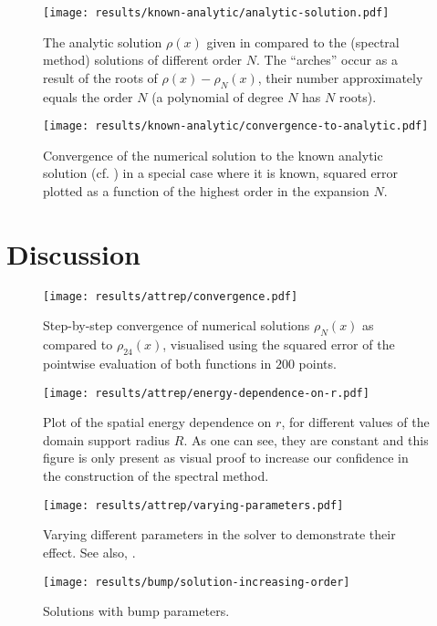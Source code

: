\begin{figure}[H]
  \centering
  \label{fig:analytic-solution}
  \texttt{[image: results/known-analytic/analytic-solution.pdf]}
  \caption[Comparison with analytical solutions and error]{
    The analytic solution $\rho(x)$ given in  compared to the (spectral method) solutions of different order $N$.
    The ``arches'' occur as a result of the roots of $\rho(x) - \rho_N(x)$, their number approximately equals the order $N$ (a polynomial of degree $N$ has $N$ roots).
  }
\end{figure}



\begin{figure}[H]
  \centering
  \label{fig:convergence-to-analytic}
  \texttt{[image: results/known-analytic/convergence-to-analytic.pdf]}
  \caption[Convergence to analytic solution]{Convergence of the numerical solution to the known analytic solution (cf. ) in a special case where it is known, squared error plotted as a function of the highest order in the expansion $N$.}
\end{figure}

\section{Discussion}
\begin{figure}[H]
  \centering
  \label{fig:convergence}
  \texttt{[image: results/attrep/convergence.pdf]}
  \caption[Step-by-step convergence of solutions compared to order 24]{Step-by-step convergence of numerical solutions $\rho_N(x)$ as compared to $\rho_{24}(x)$, visualised using the squared error of the pointwise evaluation of both functions in $200$ points.}
\end{figure}

\begin{figure}[H]
  \centering
  \label{fig:spatial-energy-dependence}
  \texttt{[image: results/attrep/energy-dependence-on-r.pdf]}
  \caption[Spatial energy dependence on $r$]{Plot of the spatial energy dependence on $r$, for different values of the domain support radius $R$. As one can see, they are constant and this figure is only present as visual proof to increase our confidence in the construction of the spectral method.}
\end{figure}

\begin{figure}[H]
  \centering
  \label{fig:varying-parameters}
  \texttt{[image: results/attrep/varying-parameters.pdf]}
  \caption[Varying parameters in the solver]{
    Varying different parameters in the solver to demonstrate their effect.
    See also, .
  }
\end{figure}

\begin{figure}[H]
  \centering
  \label{fig:bump-solutions}
  \texttt{[image: results/bump/solution-increasing-order]}
  \caption[Bump parameter solutions]{Solutions with bump parameters.}
\end{figure}
